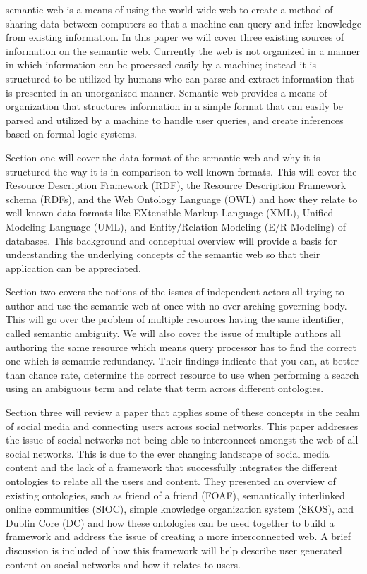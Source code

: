 \documentclass[10pt,journal,compsoc]{IEEEtran}
\begin{document}

 semantic web is a means of using the world wide web to create a method of sharing data between computers so that a machine can query and infer knowledge from existing information. In this paper we will cover three existing sources of information on the semantic web. Currently the web is not organized in a manner in which information can be processed easily by a machine; instead it is structured to be utilized by humans who can parse and extract information that is presented in an unorganized manner. Semantic web provides a means of organization that structures information in a simple format that can easily be parsed and utilized by a machine to handle user queries, and create inferences based on formal logic systems.

Section one will cover the data format of the semantic web and why it is structured the way it is in comparison to well-known formats. This will cover the Resource Description Framework (RDF), the Resource Description Framework schema (RDFs), and the Web Ontology Language (OWL) and how they relate to well-known data formats like EXtensible Markup Language (XML), Unified Modeling Language (UML), and Entity/Relation Modeling (E/R Modeling) of databases. This background and conceptual overview will provide a basis for understanding the underlying concepts of the semantic web so that their application can be appreciated.

Section two covers the notions of the issues of independent actors all trying to author and use the semantic web at once with no over-arching governing body. This will go over the problem of multiple resources having the same identifier, called semantic ambiguity. We will also cover the issue of multiple authors all authoring the same resource which means query processor has to find the correct one which is semantic redundancy. Their findings indicate that you can, at better than chance rate, determine the correct resource to use when performing a search using an ambiguous term and relate that term across different ontologies.

Section three will review a paper that applies some of these concepts in the realm of social media and connecting users across social networks. This paper addresses the issue of social networks not being able to interconnect amongst the web of all social networks. This is due to the ever changing landscape of social media content and the lack of a framework that successfully integrates the different ontologies to relate all the users and content. They presented an overview of existing ontologies, such as friend of a friend (FOAF), semantically interlinked online communities (SIOC), simple knowledge organization system (SKOS), and Dublin Core (DC) and how these ontologies can be used together to build a framework and address the issue of creating a more interconnected web. A brief discussion is included of how this framework will help describe user generated content on social networks and how it relates to users.
\end{document}
